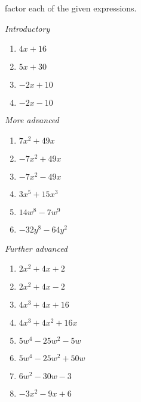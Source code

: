 \begin{myexample}
\Gls{factor} each of the given expressions.
\drillandskill
\end{myexample}

{\em Introductory}
\begin{multicols}{2}
	\begin{enumerate}
		\item $4x+16$
		\item $5x+30$
		\item $-2x+10$
		\item $-2x-10$
	\end{enumerate}
\end{multicols}
{\em More advanced}
\begin{multicols}{2}
	\begin{enumerate}
		\item $7x^2+49x$
		\item $-7x^2+49x$
		\item $-7x^2-49x$
		\item $3x^5 + 15x^3$
		\item $14w^8 - 7w^9$
		\item $-32y^8 - 64y^2$
	\end{enumerate}
\end{multicols}
{\em Further advanced}
\begin{multicols}{2}
	\begin{enumerate}
		\item $2x^2+4x+2$
		\item $2x^2+4x-2$
		\item $4x^3+4x+16$
		\item $4x^3+4x^2+16x$
		\item $5w^4 - 25w^2 - 5w$
		\item $5w^4 - 25w^2 + 50w$
		\item $6w^2 - 30w - 3$
		\item $-3x^2-9x+6$
	\end{enumerate}
\end{multicols}

